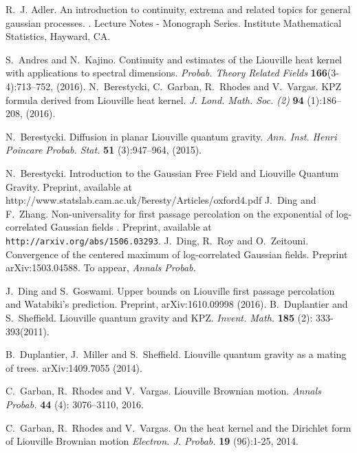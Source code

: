 \documentclass[11pt]{article}
\theoremstyle{definition}
\begin{document}
\begin{thebibliography}{10}

R.~J. Adler.
\newblock An introduction to continuity, extrema and related topics for general
  gaussian processes.
.
\newblock Lecture Notes - Monograph Series. Institute Mathematical Statistics,
  Hayward, CA.

  S.~Andres and N.~Kajino.
  \newblock Continuity and estimates of the
  Liouville heat kernel with applications
 to spectral dimensions.
 \newblock \textit{Probab. Theory Related Fields} {\bf   166}(3-4):713--752,
 (2016).
  N.~Berestycki, C.~Garban, R.~Rhodes and V.~Vargas.
 \newblock KPZ formula derived from Liouville heat kernel.
 \newblock \textit{J. Lond. Math. Soc. (2)}  {\bf 94} (1):186--208,
 (2016).

  N.~Berestycki.
   \newblock Diffusion in planar Liouville quantum gravity.
   \newblock \textit{Ann. Inst. Henri Poincare Probab. Stat.}
   {\bf 51} (3):947--964,  (2015).

N.~Berestycki.
\newblock Introduction to the Gaussian Free Field
and Liouville Quantum Gravity.
\newblock Preprint, available at
http://www.statslab.cam.ac.uk/\~beresty/Articles/oxford4.pdf
J.~Ding and F.~Zhang.
\newblock  Non-universality for first passage percolation on the exponential of log-correlated Gaussian fields
.
\newblock Preprint, available at \verb|http://arxiv.org/abs/1506.03293|.
  J.~Ding, R.~Roy and O.~Zeitouni.
  \newblock Convergence of the centered maximum of log-correlated Gaussian fields.
  \newblock Preprint 	arXiv:1503.04588. To appear, \textit{Annals Probab.}

  J.~Ding and S.~Goswami.
  \newblock Upper bounds on Liouville first passage percolation and Watabiki's prediction.
  \newblock Preprint, 	arXiv:1610.09998 (2016).
B.~Duplantier and S.~Sheffield.
\newblock
Liouville quantum gravity and KPZ.
\newblock \textit{Invent. Math.} {\bf   185} (2): 333-393(2011).

  B.~Duplantier, J.~Miller and S.~Sheffield.
  \newblock Liouville quantum gravity as a mating of trees.
  \newblock arXiv:1409.7055 (2014).

C.~Garban, R.~Rhodes and V.~Vargas.
\newblock Liouville Brownian motion.
\newblock \textit{Annals Probab.} {\bf 44} (4): 3076--3110, 2016.

C.~Garban, R.~Rhodes and V.~Vargas.
\newblock On the heat kernel and the Dirichlet form of Liouville Brownian motion
\newblock \textit{Electron. J. Probab.} {\bf 19} (96):1-25, 2014.



\end{thebibliography}
\end{document}
